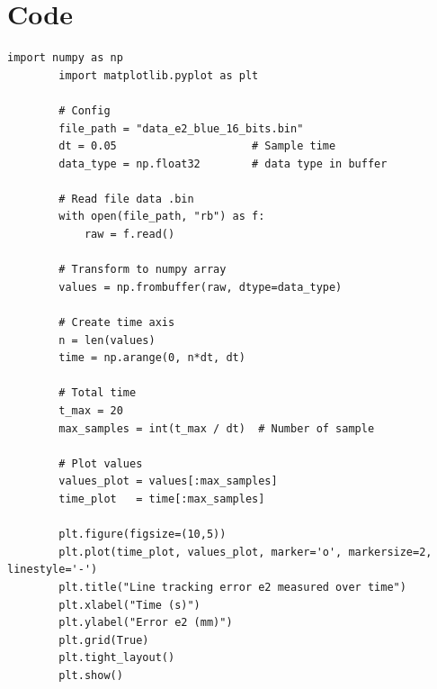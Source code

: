     \section{Code}
    \begin{lstlisting}[caption={Đọc file nhị phân và plot sai số e2}, label={lst:e2_plot}]
        import numpy as np
        import matplotlib.pyplot as plt

        # Config
        file_path = "data_e2_blue_16_bits.bin" 
        dt = 0.05                     # Sample time
        data_type = np.float32        # data type in buffer

        # Read file data .bin
        with open(file_path, "rb") as f:
            raw = f.read()

        # Transform to numpy array
        values = np.frombuffer(raw, dtype=data_type)

        # Create time axis
        n = len(values)
        time = np.arange(0, n*dt, dt)

        # Total time
        t_max = 20
        max_samples = int(t_max / dt)  # Number of sample

        # Plot values
        values_plot = values[:max_samples]
        time_plot   = time[:max_samples]

        plt.figure(figsize=(10,5))
        plt.plot(time_plot, values_plot, marker='o', markersize=2, linestyle='-')
        plt.title("Line tracking error e2 measured over time")
        plt.xlabel("Time (s)")
        plt.ylabel("Error e2 (mm)")
        plt.grid(True)
        plt.tight_layout()
        plt.show()
    \end{lstlisting}

        
